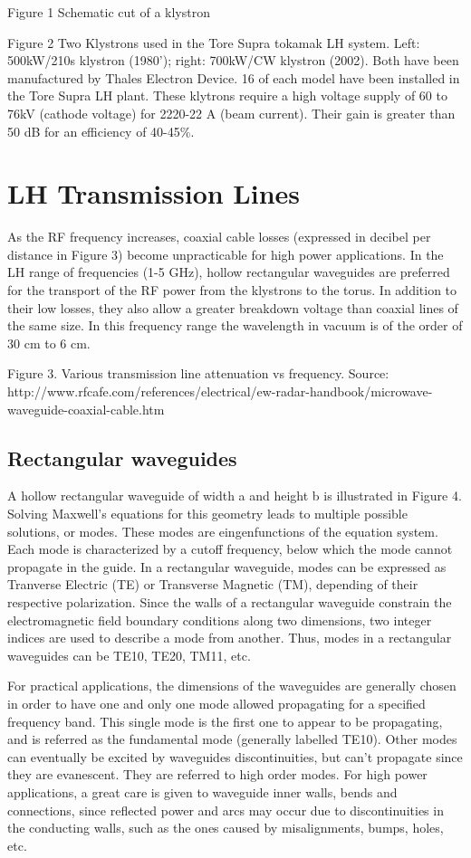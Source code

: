 Figure 1 Schematic cut of a klystron


Figure 2 Two Klystrons used in the Tore Supra tokamak LH system. Left: 500kW/210s klystron (1980'); right: 700kW/CW klystron (2002). Both have been manufactured by Thales Electron Device. 16 of each model have been installed in the Tore Supra LH plant. These klytrons require a high voltage supply of 60 to 76kV (cathode voltage) for 2220-22 A (beam current). Their gain is greater than 50 dB for an efficiency of 40-45\%.

\section{LH Transmission Lines}
As the RF frequency increases, coaxial cable losses (expressed in decibel per distance in Figure 3) become unpracticable for high power applications. In the LH range of frequencies (1-5 GHz), hollow rectangular waveguides are preferred for the transport of the RF power from the klystrons to the torus. In addition to their low losses, they also allow a greater breakdown voltage than coaxial lines of the same size. In this frequency range the wavelength in vacuum is of the order of 30 cm to 6 cm.

Figure 3. Various transmission line attenuation vs frequency. Source: http://www.rfcafe.com/references/electrical/ew-radar-handbook/microwave-waveguide-coaxial-cable.htm

\subsection{Rectangular waveguides} 
A hollow rectangular waveguide of width a and height b is illustrated in Figure 4. Solving Maxwell’s equations for this geometry leads to multiple possible solutions, or modes. These modes are eingenfunctions of the equation system. Each mode is characterized by a cutoff frequency, below which the mode cannot propagate in the guide. In a rectangular waveguide, modes can be expressed as Tranverse Electric (TE) or Transverse Magnetic (TM), depending of their respective polarization. Since the walls of a rectangular waveguide constrain the electromagnetic field boundary conditions along two dimensions, two integer indices are used to describe a mode from another. Thus, modes in a rectangular waveguides can be TE10, TE20, TM11, etc. 

For practical applications, the dimensions of the waveguides are generally chosen in order to have one and only one mode allowed propagating for a specified frequency band. This single mode is the first one to appear to be propagating, and is referred as the fundamental mode (generally labelled TE10). Other modes can eventually be excited by waveguides discontinuities, but can’t propagate since they are evanescent. They are referred to high order modes.
For high power applications, a great care is given to waveguide inner walls, bends and connections, since reflected power and arcs may occur due to discontinuities in the conducting walls, such as the ones caused by misalignments, bumps, holes, etc.

